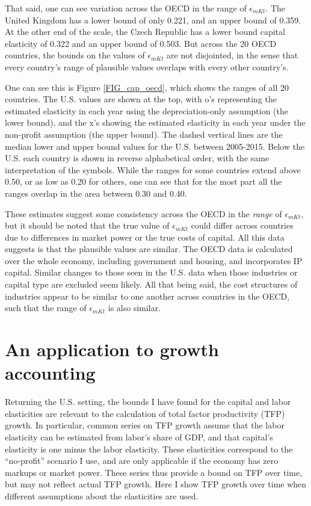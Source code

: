 \documentclass[11pt]{article}
\begin{document}
That said, one can see variation across the OECD in the range of $\epsilon_{mKt}$. The United Kingdom has a lower bound of only 0.221, and an upper bound of 0.359. At the other end of the scale, the Czech Republic has a lower bound capital elasticity of 0.322 and an upper bound of 0.503. But across the 20 OECD countries, the bounds on the values of $\epsilon_{mKt}$ are not disjointed, in the sense that every country's range of plausible values overlaps with every other country's.

One can see this is Figure \ref{FIG_cap_oecd}, which shows the ranges of all 20 countries. The U.S. values are shown at the top, with o's representing the estimated elasticity in each year using the depreciation-only assumption (the lower bound), and the x's showing the estimated elasticity in each year under the non-profit assumption (the upper bound). The dashed vertical lines are the median lower and upper bound values for the U.S. between 2005-2015. Below the U.S. each country is shown in reverse alphabetical order, with the same interpretation of the symbols. While the ranges for some countries extend above 0.50, or as low as 0.20 for others, one can see that for the most part all the ranges overlap in the area between 0.30 and 0.40. 

These estimates suggest some consistency across the OECD in the \textit{range} of $\epsilon_{mKt}$, but it should be noted that the true value of $\epsilon_{mKt}$ could differ across countries due to differences in market power or the true costs of capital. All this data suggests is that the plausible values are similar. The OECD data is calculated over the whole economy, including government and housing, and incorporates IP capital. Similar changes to those seen in the U.S. data when those industries or capital type are excluded seem likely. All that being said, the cost structures of industries appear to be similar to one another across countries in the OECD, such that the range of $\epsilon_{mKt}$ is also similar.

\section{An application to growth accounting}
Returning the U.S. setting, the bounds I have found for the capital and labor elasticities are relevant to the calculation of total factor productivity (TFP) growth. In particular, common series on TFP growth assume that the labor elasticity can be estimated from labor's share of GDP, and that capital's elasticity is one minus the labor elasticity. These elasticities correspond to the ``no-profit'' scenario I use, and are only applicable if the economy has zero markups or market power. These series thus provide a bound on TFP over time, but may not reflect actual TFP growth. Here I show TFP growth over time when different assumptions about the elasticities are used. 
\end{document}
